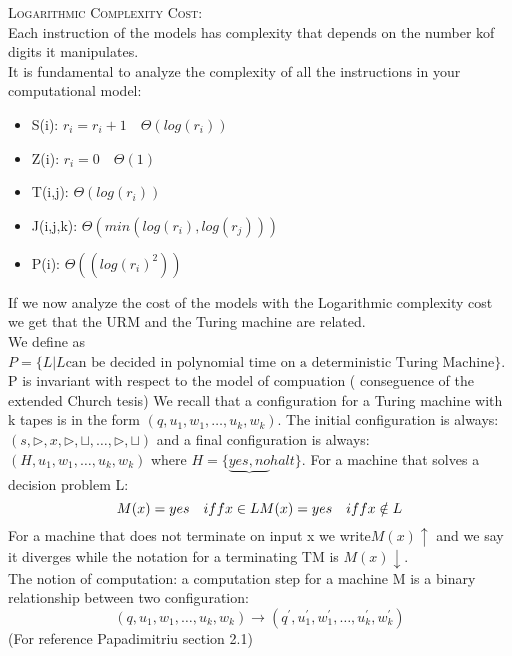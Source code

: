 \textsc{Logarithmic Complexity Cost}:\\
Each instruction of the models has complexity that depends on the number kof digits it manipulates.\\
It is fundamental to analyze the complexity of all the instructions in your computational model:
\begin{itemize}
    \item S(i): $r_i = r_i+1 \quad \Theta(log(r_i))$
    \item Z(i): $r_i = 0 \quad \Theta(1)$
    \item T(i,j): $\Theta(log(r_i))$
    \item J(i,j,k): $\Theta(min(log(r_i), log(r_j)))$
    \item P(i): $\Theta((log(r_i)^2))$
\end{itemize}
If we now analyze the cost of the models with the Logarithmic complexity cost we get that the URM and the Turing machine are related.\\
We define as $ P = \{L | L \text{can be decided in polynomial time on a deterministic Turing Machine}\} $. P is invariant with respect to the model of compuation ( conseguence of the extended Church tesis)
We recall that a configuration for a Turing machine with k tapes is in the form $(q,u_{1},w_{1}, \ldots,u_{k},w_{k})$. The initial configuration is always: $ (s,\triangleright, x, \triangleright,\sqcup, \ldots, \triangleright,\sqcup) $ and a final configuration is always: $ (H,u_{1},w_{1}, \ldots,u_{k},w_{k}) $ where $ H=\{\underbrace{yes,no} halt\} $. For a machine that solves a decision problem L: \[ 
    M(x) = yes\quad iff x\in L\\
    M(x) = yes\quad iff x \notin L
\]
For a machine that does not terminate on input x we write$ M(x) \uparrow $ and we say it diverges while the notation for a terminating TM is $ M(x) \downarrow $.\\
The notion of computation: a computation step for a machine M is a binary relationship between two configuration: \[ 
    (q, u_{1},w_{1}, \ldots,u_{k},w_{k}) \longrightarrow (q^{'},u_{1}^{'},w_{1}^{'}, \ldots,u_{k}^{'},w_{k}^{'})
\]
(For reference Papadimitriu section 2.1)


